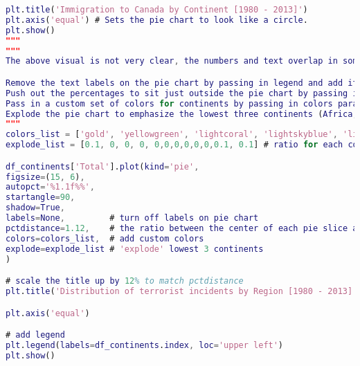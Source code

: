 \documentclass{cumcmthesis}
\begin{document}
\begin{lstlisting}[language=matlab]
plt.title('Immigration to Canada by Continent [1980 - 2013]')
plt.axis('equal') # Sets the pie chart to look like a circle.
plt.show()
"""
"""
The above visual is not very clear, the numbers and text overlap in some instances. Let's make a few modifications to improve the visuals:

Remove the text labels on the pie chart by passing in legend and add it as a seperate legend using plt.legend().
Push out the percentages to sit just outside the pie chart by passing in pctdistance parameter.
Pass in a custom set of colors for continents by passing in colors parameter.
Explode the pie chart to emphasize the lowest three continents (Africa, North America, and Latin America and Carribbean) by pasing in explode parameter.
"""
colors_list = ['gold', 'yellowgreen', 'lightcoral', 'lightskyblue', 'lightgreen', 'pink','black','antiquewhite','azure','cyan','darkred','deeppink']
explode_list = [0.1, 0, 0, 0, 0,0,0,0,0,0,0.1, 0.1] # ratio for each continent with which to offset each wedge.

df_continents['Total'].plot(kind='pie',
figsize=(15, 6),
autopct='%1.1f%%',
startangle=90,
shadow=True,
labels=None,         # turn off labels on pie chart
pctdistance=1.12,    # the ratio between the center of each pie slice and the start of the text generated by autopct
colors=colors_list,  # add custom colors
explode=explode_list # 'explode' lowest 3 continents
)

# scale the title up by 12% to match pctdistance
plt.title('Distribution of terrorist incidents by Region [1980 - 2013]', y=1.12)

plt.axis('equal')

# add legend
plt.legend(labels=df_continents.index, loc='upper left')
plt.show()

 \end{lstlisting}
\end{document}
